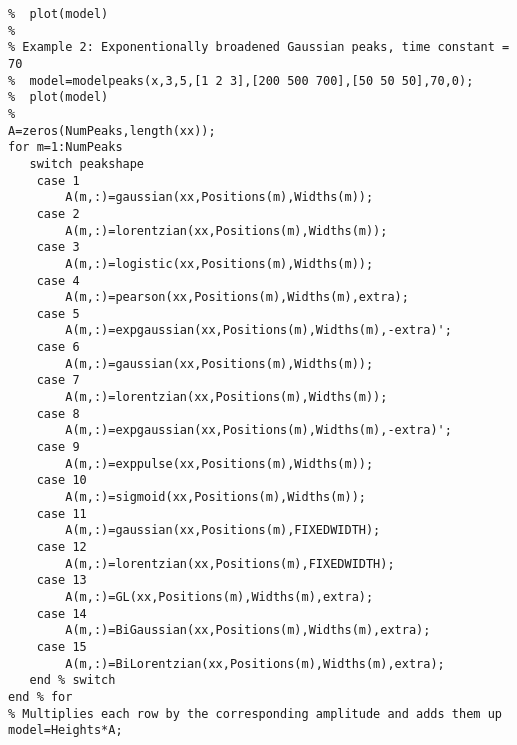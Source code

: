 \begin{lstlisting}
%  plot(model)
%
% Example 2: Exponentionally broadened Gaussian peaks, time constant = 70
%  model=modelpeaks(x,3,5,[1 2 3],[200 500 700],[50 50 50],70,0);
%  plot(model)
%
A=zeros(NumPeaks,length(xx));
for m=1:NumPeaks
   switch peakshape
    case 1
        A(m,:)=gaussian(xx,Positions(m),Widths(m));
    case 2
        A(m,:)=lorentzian(xx,Positions(m),Widths(m));
    case 3
        A(m,:)=logistic(xx,Positions(m),Widths(m));
    case 4
        A(m,:)=pearson(xx,Positions(m),Widths(m),extra);
    case 5
        A(m,:)=expgaussian(xx,Positions(m),Widths(m),-extra)';
    case 6
        A(m,:)=gaussian(xx,Positions(m),Widths(m));
    case 7
        A(m,:)=lorentzian(xx,Positions(m),Widths(m));  
    case 8
        A(m,:)=expgaussian(xx,Positions(m),Widths(m),-extra)';    
    case 9
        A(m,:)=exppulse(xx,Positions(m),Widths(m));  
    case 10
        A(m,:)=sigmoid(xx,Positions(m),Widths(m)); 
    case 11
        A(m,:)=gaussian(xx,Positions(m),FIXEDWIDTH);
    case 12
        A(m,:)=lorentzian(xx,Positions(m),FIXEDWIDTH); 
    case 13
        A(m,:)=GL(xx,Positions(m),Widths(m),extra);
    case 14
        A(m,:)=BiGaussian(xx,Positions(m),Widths(m),extra);       
    case 15
        A(m,:)=BiLorentzian(xx,Positions(m),Widths(m),extra);       
   end % switch
end % for
% Multiplies each row by the corresponding amplitude and adds them up
model=Heights*A;
\end{lstlisting}
